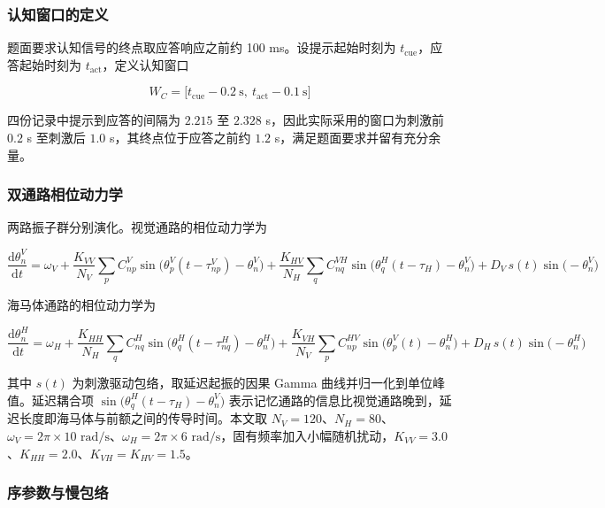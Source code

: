 \documentclass[bwprint]{gmcmthesis}
\begin{document}
\subsubsection{认知窗口的定义}

题面要求认知信号的终点取应答响应之前约 100 ms。设提示起始时刻为 $t_{\mathrm{cue}}$，应答起始时刻为 $t_{\mathrm{act}}$，定义认知窗口

\begin{equation}
W_C = \bigl[t_{\mathrm{cue}} - 0.2\ \mathrm{s},\ t_{\mathrm{act}} - 0.1\ \mathrm{s}\bigr]
\end{equation}

四份记录中提示到应答的间隔为 $2.215$ 至 $2.328$ s，因此实际采用的窗口为刺激前 $0.2$ s 至刺激后 $1.0$ s，其终点位于应答之前约 $1.2$ s，满足题面要求并留有充分余量。

\subsubsection{双通路相位动力学}

两路振子群分别演化。视觉通路的相位动力学为

\begin{equation}
\frac{\mathrm{d}\theta_n^{V}}{\mathrm{d}t} = \omega_V + \frac{K_{VV}}{N_V}\sum_{p}C^{V}_{np}\sin\bigl(\theta_p^{V}(t-\tau^{V}_{np}) - \theta_n^{V}\bigr) + \frac{K_{HV}}{N_H}\sum_{q}C^{VH}_{nq}\sin\bigl(\theta_q^{H}(t-\tau_H) - \theta_n^{V}\bigr) + D_V\,s(t)\sin\bigl(-\theta_n^{V}\bigr)
\end{equation}

海马体通路的相位动力学为

\begin{equation}
\frac{\mathrm{d}\theta_n^{H}}{\mathrm{d}t} = \omega_H + \frac{K_{HH}}{N_H}\sum_{q}C^{H}_{nq}\sin\bigl(\theta_q^{H}(t-\tau^{H}_{nq}) - \theta_n^{H}\bigr) + \frac{K_{VH}}{N_V}\sum_{p}C^{HV}_{np}\sin\bigl(\theta_p^{V}(t) - \theta_n^{H}\bigr) + D_H\,s(t)\sin\bigl(-\theta_n^{H}\bigr)
\end{equation}

其中 $s(t)$ 为刺激驱动包络，取延迟起振的因果 Gamma 曲线并归一化到单位峰值。延迟耦合项 $\sin\bigl(\theta_q^{H}(t-\tau_H) - \theta_n^{V}\bigr)$ 表示记忆通路的信息比视觉通路晚到，延迟长度即海马体与前额之间的传导时间。本文取 $N_V = 120$、$N_H = 80$、$\omega_V = 2\pi \times 10$ $\mathrm{rad/s}$、$\omega_H = 2\pi \times 6$ $\mathrm{rad/s}$，固有频率加入小幅随机扰动，$K_{VV} = 3.0$、$K_{HH} = 2.0$、$K_{VH} = K_{HV} = 1.5$。

\subsubsection{序参数与慢包络}
\end{document}
